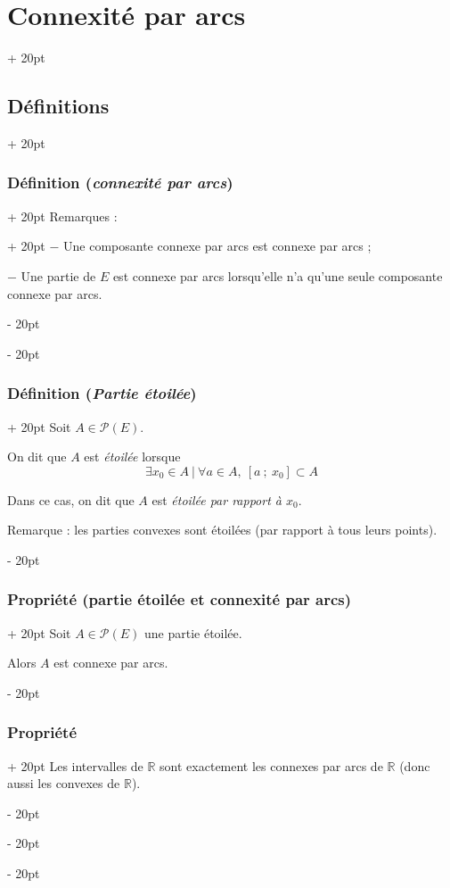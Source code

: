 \documentclass[a4paper, 12pt, twoside]{article}
\newcommand{\R}{\mathbb{R}} %
\newcommand{\seg}[2]{\left[ #1\ ;\ #2 \right]}
\newcommand{\ind}[1][20pt]{\advance\leftskip + #1}
\newcommand{\deind}[1][20pt]{\advance\leftskip - #1}
\newenvironment{indt}[2][20pt]{#2 \par \ind[#1]}{\par \deind} %
\begin{document}
\begin{indt}{\section{Connexité par arcs}}
\begin{indt}{\subsection{Définitions}}
\begin{indt}{\subsubsection{Définition (\textit{connexité par arcs})}}
                \begin{indt}{Remarques :}
                    $-$ Une composante connexe par arcs est connexe par arcs ;

                    $-$ Une partie de $E$ est connexe par arcs lorsqu'elle n'a qu'une seule composante connexe par arcs.
                \end{indt}
            \end{indt}

            \vspace{12pt}
            
            \begin{indt}{\subsubsection{Définition (\textit{Partie étoilée})}}
                Soit $A \in \mathcal P(E)$.

                \vspace{6pt}
                
                On dit que $A$ est \emph{étoilée} lorsque
                \[
                    \exists x_0 \in A\ |\
                    \forall a \in A,\ \seg a {x_0} \subset A
                \]

                Dans ce cas, on dit que $A$ est \emph{étoilée par rapport à $x_0$}.

                \vspace{12pt}
                
                Remarque : les parties convexes sont étoilées (par rapport à tous leurs points).
            \end{indt}

            \vspace{12pt}
            
            \begin{indt}{\subsubsection{Propriété (partie étoilée et connexité par arcs)}}
                Soit $A \in \mathcal P(E)$ une partie étoilée.
                
                Alors $A$ est connexe par arcs.
            \end{indt}

            \vspace{12pt}
            
            \begin{indt}{\subsubsection{Propriété}}
                Les intervalles de $\R$ sont exactement les connexes par arcs de $\R$ (donc aussi les convexes de $\R$).
            \end{indt}
        \end{indt}


\end{indt}
\end{document}
